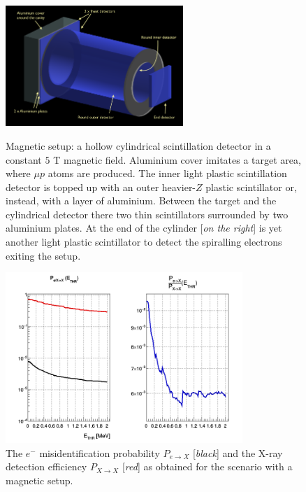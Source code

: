 \documentclass[12pt]{article}
\begin{document}
\begin{figure}[!htbp]
\centering
\includegraphics[width=0.6\textwidth]{img/magnetic.png}
\caption{Magnetic setup: a hollow cylindrical scintillation detector in a constant $5$ T magnetic field. Aluminium cover imitates a target area, where $\mu{p}$ atoms are produced. The inner light plastic scintillation detector is topped up with an outer heavier-$Z$ plastic scintillator or, instead, with a layer of aluminium. Between the target and the cylindrical detector there two thin scintillators surrounded by two aluminium plates. At the end of the cylinder [\textit{on the right}] is yet another light plastic scintillator to detect the spiralling electrons exiting the setup.}
\label{fig:magnetic}
\centering
\includegraphics[width=0.8\textwidth]{img/bfield2.png}
\caption{The $e^-$ misidentification probability $P_{e{\rightarrow}X}$ [\textit{black}] and the X-ray detection efficiency $P_{X{\rightarrow}X}$ [\textit{red}] as obtained for the scenario with a magnetic setup.}
\label{fig:bfield}
\end{figure}
\end{document}
